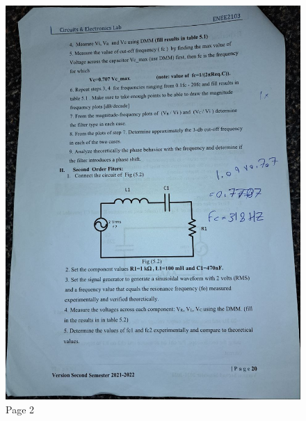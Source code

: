 \documentclass[12pt]{article}
\begin{document}
\begin{figure}[H]
    \centering
    \includegraphics[width=\textwidth]{assets/i2.jpg}
    \caption{Page 2}
\end{figure}
\end{document}
